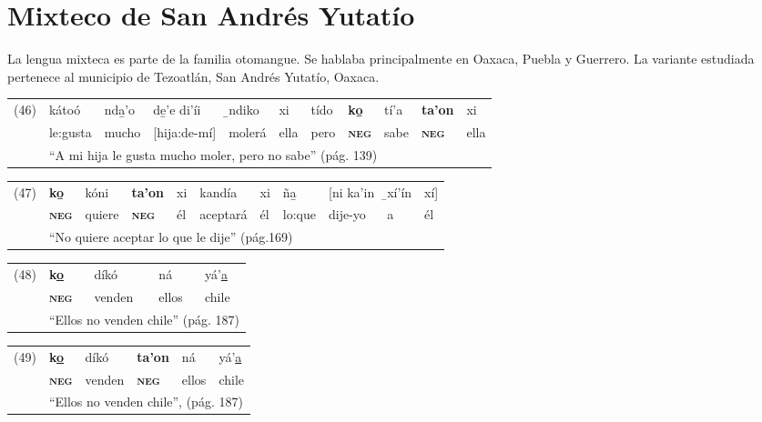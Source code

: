 \section*{Mixteco de San Andrés Yutatío}

\noindent La lengua mixteca es parte de la familia otomangue. Se hablaba principalmente en Oaxaca, Puebla y Guerrero. La variante estudiada pertenece al municipio de Tezoatlán, San Andrés Yutatío, Oaxaca. \vspace{0.3cm}

{\setmainfont{Charis SIL} 
\textbf{}%
\begin{tabular}{lllllllllll}
(46) & kátoó & nda̱'o & de̱'e di'íi & ̱ndiko & xi & tído & \textbf{ko̱} & tí'a & \textbf{ta'on} & xi \\
& le:gusta & mucho & [hija:de-mí] & molerá & ella & pero & \textsc{\textbf{neg}} & sabe & \textsc{\textbf{neg}} & ella \\
& \multicolumn{10}{l}{``A mi hija le gusta mucho moler, pero no sabe'' (pág. 139)}
\end{tabular} \vspace{0.2cm}

\begin{tabular}{lllllllllll}
(47) & \textbf{ko̱} & kóni & \textbf{ta'on} & xi & kandía & xi & ña̱ & [ni ka'in & ̱xí'ín & xí] \\
& \textsc{\textbf{neg}} & quiere & \textsc{\textbf{neg}} & él & aceptará & él & lo:que & dije-yo & a & él \\
& \multicolumn{10}{l}{``No quiere aceptar lo que le dije'' (pág.169)}
\end{tabular} \vspace{0.2cm}

\begin{tabular}{lllll}
(48) & \textbf{k\underline{o}} & díkó & ná & yá'\underline{a} \\
& \textsc{\textbf{neg}} & venden & ellos & chile \\
& \multicolumn{4}{l}{``Ellos no venden chile'' (pág. 187)}
\end{tabular} \vspace{0.2cm}

\begin{tabular}{llllll}
(49) &  \textbf{k\underline{o}} & díkó & \textbf{ta'on} & ná & yá'\underline{a} \\
& \textsc{\textbf{neg}} & venden & \textsc{\textbf{neg}} & ellos & chile \\
& \multicolumn{5}{l}{``Ellos no venden chile'', (pág. 187)}
\end{tabular} \vspace{0.2cm}

}
